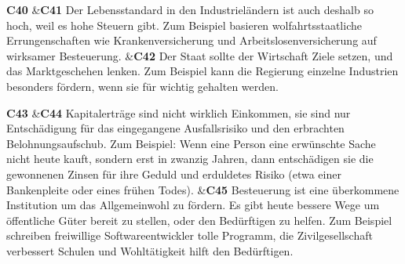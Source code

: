\documentclass[
		11pt,
		a4paper,
		openright,
		oneside,
		ngerman
	]
	{book}
\begin{document}
\begin{longtabu}[htpb]
\textbf{C40}
&\textbf{C41} %
		Der Lebensstandard in den Industrieländern ist auch deshalb so hoch, weil es hohe Steuern gibt.
		Zum Beispiel basieren wolfahrtsstaatliche Errungenschaften wie Krankenversicherung und Arbeitslosenversicherung auf wirksamer Besteuerung.
&\textbf{C42}
		Der Staat sollte der Wirtschaft Ziele setzen, und das Marktgeschehen lenken.
		Zum Beispiel kann die Regierung einzelne Industrien besonders fördern, wenn sie für wichtig gehalten werden.
\\

\midrule

\textbf{C43}
&\textbf{C44} %
		Kapitalerträge sind nicht wirklich Einkommen, sie sind nur Entschädigung für das eingegangene Ausfallsrisiko und den erbrachten Belohnungsaufschub.
		Zum Beispiel: Wenn eine Person eine erwünschte Sache nicht heute kauft, sondern erst in zwanzig Jahren, dann entschädigen sie die gewonnenen Zinsen für ihre Geduld und erduldetes Risiko (etwa einer Bankenpleite oder eines frühen Todes).
&\textbf{C45} %
		Besteuerung ist eine überkommene Institution um das Allgemeinwohl zu fördern.
		Es gibt heute bessere Wege um öffentliche Güter bereit zu stellen, oder den Bedürftigen zu helfen.
		Zum Beispiel schreiben freiwillige Softwareentwickler tolle Programm, die Zivilgesellschaft verbessert Schulen und Wohltätigkeit hilft den Bedürftigen.
\\


\end{longtabu}
\end{document}
